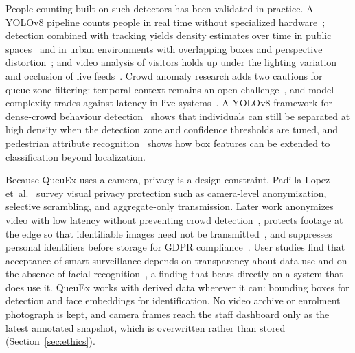 \documentclass{research}
\newcommand{\sysname}{QueuEx}
\begin{document}
People counting built on such detectors has been validated in practice.
A YOLOv8 pipeline counts people in real time without specialized
hardware~\cite{rrlcomp001realtimepeople}; detection combined with
tracking yields density estimates over time in public
spaces~\cite{rrlcomp031peoplecountingpublic} and in urban environments
with overlapping boxes and perspective
distortion~\cite{rrlcomp032visionpeoplecounting}; and video analysis of
visitors holds up under the lighting variation and occlusion of live
feeds~\cite{rrlcomp033deeplearningvideo}. Crowd anomaly research adds
two cautions for queue-zone filtering: temporal context remains an open
challenge~\cite{rrlcomp034deepcrowdanomaly}, and model complexity trades
against latency in live systems~\cite{rrlcomp042surveydeeplearning}. A
YOLOv8 framework for dense-crowd behaviour
detection~\cite{rrlcomp043enhancedframeworkreal} shows that individuals
can still be separated at high density when the detection zone and
confidence thresholds are tuned, and pedestrian attribute
recognition~\cite{rrlcomp020frameworkpedestrianattribute} shows how box
features can be extended to classification beyond localization.

Because \sysname{} uses a camera, privacy is a design constraint.
Padilla-Lopez et~al.~\cite{padillalopez2015privacy} survey visual
privacy protection such as camera-level anonymization, selective
scrambling, and aggregate-only transmission. Later work anonymizes video
with low latency without preventing crowd
detection~\cite{rrlcomp013lowlatencyvideo}, protects footage at the edge
so that identifiable images need not be
transmitted~\cite{rrlcomp021privacypreservingsurveillance}, and
suppresses personal identifiers before storage for GDPR
compliance~\cite{rrlcomp040deeplearninggdpr}. User studies find that
acceptance of smart surveillance depends on transparency about data use
and on the absence of facial
recognition~\cite{rrlcomp022perceptionrisksusefulness}, a finding that
bears directly on a system that does use it. \sysname{} works with
derived data wherever it can: bounding boxes for detection and face
embeddings for identification. No video archive or enrolment photograph
is kept, and camera frames reach the staff dashboard only as the latest
annotated snapshot, which is overwritten rather than stored
(Section~\ref{sec:ethics}).
\end{document}
